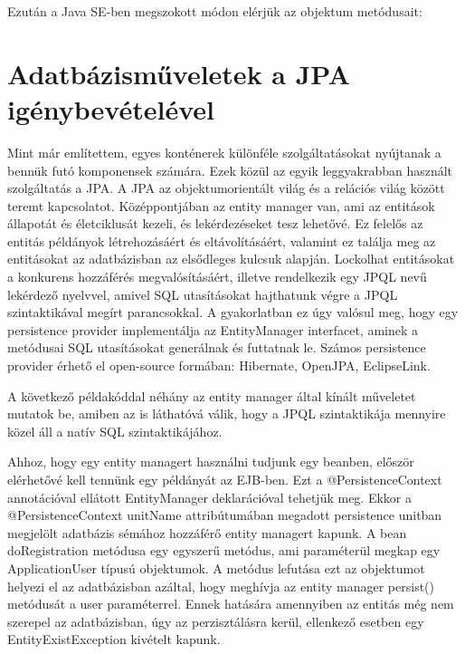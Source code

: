 \documentclass[centeredchapter]{thesis-ekf}
\theoremstyle{definition}
\theoremstyle{remark}
\begin{document}


Ezután a Java SE-ben megszokott módon elérjük az objektum metódusait:



\section{Adatbázisműveletek a JPA igénybevételével}

Mint már említettem, egyes konténerek különféle szolgáltatásokat nyújtanak a bennük futó komponensek számára. Ezek közül az egyik leggyakrabban használt szolgáltatás a JPA.
A JPA az objektumorientált világ és a relációs világ között teremt kapcsolatot. Középpontjában az entity manager van, ami az entitások állapotát és életciklusát kezeli, és lekérdezéseket tesz lehetővé. Ez felelős az entitás példányok létrehozásáért és eltávolításáért, valamint ez találja meg az entitásokat az adatbázisban az elsődleges kulcsuk alapján. Lockolhat entitásokat a konkurens hozzáférés megvalósításáért, illetve rendelkezik egy JPQL nevű lekérdező nyelvvel, amivel SQL  utasításokat hajthatunk végre a JPQL szintaktikával megírt parancsokkal. A gyakorlatban ez úgy valósul meg, hogy egy persistence provider implementálja az EntityManager interfacet, aminek a metódusai SQL utasításokat generálnak és futtatnak le. Számos persistence provider érhető el open-source formában: Hibernate, OpenJPA, EclipseLink.

A következő példakóddal néhány az entity manager által kínált műveletet mutatok be, amiben az is láthatóvá válik, hogy a JPQL szintaktikája mennyire közel áll a natív SQL szintaktikájához.



Ahhoz, hogy egy entity managert használni tudjunk egy beanben, először elérhetővé kell tennünk egy példányát az EJB-ben. Ezt a @PersistenceContext annotációval ellátott EntityManager deklarációval tehetjük meg. Ekkor a @PersistenceContext unitName attribútumában megadott persistence unitban megjelölt adatbázis sémához hozzáférő entity managert kapunk. A bean doRegistration metódusa egy egyszerű metódus, ami paraméterül megkap egy ApplicationUser típusú objektumok. A metódus lefutása ezt az objektumot helyezi el az adatbázisban azáltal, hogy meghívja az entity manager persist() metódusát a user paraméterrel. Ennek hatására amennyiben az entitás még nem szerepel az adatbázisban, úgy az perzisztálásra kerül, ellenkező esetben egy EntityExistException kivételt kapunk.
\end{document}
